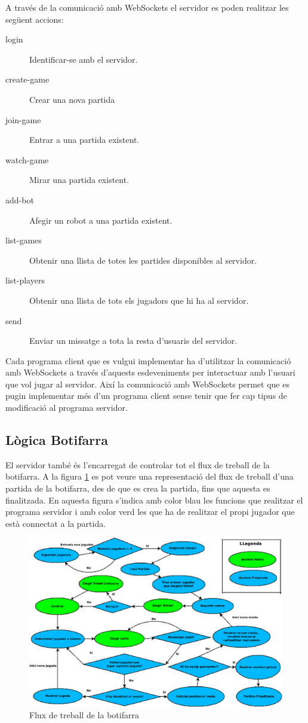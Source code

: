 A través de la comunicació amb WebSockets el servidor es poden realitzar les següent accions: 

\begin{description}
\item[login] {Identificar-se amb el servidor.}
\item[create-game] {Crear una nova partida}
\item[join-game] {Entrar a una partida existent.}
\item[watch-game] {Mirar una partida existent.}
\item[add-bot] {Afegir un robot a una partida existent.}
\item[list-games] {Obtenir una llista de totes les partides disponibles al servidor.}
\item[list-players] {Obtenir una llista de tots els jugadors que hi ha al servidor.}
\item[send] {Enviar un missatge a tota la resta d'usuaris del servidor. }
\end{description}

Cada programa client que es vulgui implementar ha d'utilitzar la comunicació amb WebSockets a través d'aquests esdeveniments per interactuar amb l'usuari que vol jugar al servidor. Així la comunicació amb WebSockets permet que es pugin implementar més d'un programa client sense tenir que fer cap tipus de modificació al programa servidor. 

\subsection{Lògica Botifarra}

El servidor també és l'encarregat de controlar tot el flux de treball de la botifarra. A la figura \ref{fig:buti-workflow} es pot veure una representació del flux de treball d'una partida de la botifarra, des de que es crea la partida, fins que aquesta es finalitzada. En aquesta figura s'indica amb color blau les funcions que realitzar el programa servidor i amb color verd les que ha de realitzar el propi jugador que està connectat a la partida. 

\begin{figure}[htbp]
\hspace*{-1.5in}
\centering\includegraphics{img/butifarra_workflow.png}
\caption{Flux de treball de la botifarra}
\label{fig:buti-workflow}
\end{figure} 

